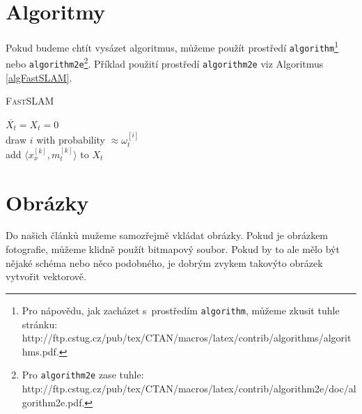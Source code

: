 \documentclass[11pt,a4paper]{article}
\begin{document}
\section{Algoritmy}
Pokud budeme chtít vysázet algoritmus, můžeme použít prostředí \texttt{algorithm}\footnote{Pro nápovědu, jak zacházet s~prostředím \texttt{algorithm}, můžeme zkusit tuhle stránku:\\
http://ftp.cstug.cz/pub/tex/CTAN/macros/latex/contrib/algorithms/algorithms.pdf.} nebo \texttt{algorithm2e}\footnote{Pro \texttt{algorithm2e} zase tuhle: http://ftp.cstug.cz/pub/tex/CTAN/macros/latex/contrib/algorithm2e/doc/algorithm2e.pdf.}.
Příklad použití prostředí \texttt{algorithm2e} viz Algoritmus \ref{algFastSLAM}.
\begin{algorithm}
\label{algFastSLAM}
\SetNlSty{}{}{:}
\SetNlSkip{-1.1em}
\caption{\textsc{FastSLAM}}
\Indp
$\overline{X_t} = X_t = 0$\\
{draw $i$ with probability $\approx\omega_t^{[i]}$\\
add $\langle x_x^{[k]}, m_t^{[k]}\rangle$ to $X_t$}
\end{algorithm}
\section{Obrázky}
Do našich článků mužeme samozřejmě vkládat obrázky. Pokud je obrázkem fotografie, můžeme klidně použít
bitmapový soubor. Pokud by to ale mělo být nějaké schéma nebo něco podobného, je dobrým zvykem takovýto
obrázek vytvořit vektorově.
\end{document}
